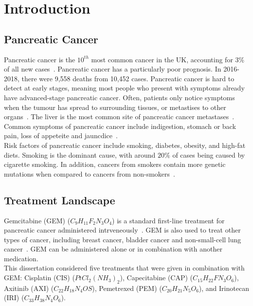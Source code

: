 \chapter{Introduction}

\section{Pancreatic Cancer}
Pancreatic cancer is the $10^{th}$ most common cancer in the UK, accounting for $3\%$ of all new cases~\cite{pancStat}. Pancreatic cancer has a particularly poor prognosis. In 2016-2018, there were 9,558 deaths from 10,452 cases. Pancreatic cancer is hard to detect at early stages, meaning most people who present with symptoms already have advanced-stage pancreatic cancer. Often, patients only notice symptoms when the tumour has spread to surrounding tissues, or metastises to other organs~\cite{kelsen}. The liver is the most common site of pancreatic cancer metastases~\cite{deeb}. Common symptoms of pancreatic cancer include indigestion, stomach or back pain, loss of appeteite and jauncdice~\cite{pancSymp}. \\

Risk factors of pancreatic cancer include smoking, diabetes, obesity, and high-fat diets. Smoking is the dominant cause, with around $20\%$ of cases being caused by cigarette smoking. In addition, cancers from smokers contain more genetic mutations when compared to cancers from non-smokers~\cite{blackford}. 

\section{Treatment Landscape}
Gemcitabine (GEM) ($C_9H_{11}F_2N_3O_4$) is a standard first-line treatment for pancreatic cancer administered intrveneously~\cite{NG85}. GEM is also used to treat other types of cancer, including breast cancer, bladder cancer and non-small-cell lung cancer~\cite{wong2009}. GEM can be administered alone or in combination with another medication.\\

This dissertation considered five treatments that were given in combination with GEM: Cisplatin (CIS) ($PtCl_2(NH_3)_2$), Capecitabine (CAP) ($C_{15}H_{22}FN_3O_6$), Axitinib (AXI) ($C_{22}H_{18}N_4OS$), Pemetrexed (PEM) ($C_{20}H_{21}N_5O_6$), and Irinotecan (IRI) ($C_{33}H_{38}N_4O_6$).

